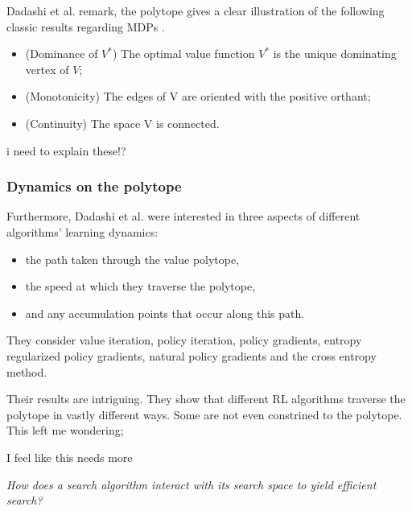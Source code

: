 Dadashi et al. remark, the polytope gives a clear illustration of the following classic results regarding MDPs \cite{Bertsekas1996}.

\begin{itemize}
\tightlist
  \item (Dominance of $V^*$) The optimal value function $V^*$ is the unique dominating vertex of $V$;
  \item (Monotonicity) The edges of V are oriented with the positive orthant;
  \item (Continuity) The space V is connected.
\end{itemize}

{\color{red} i need to explain these!?}


\subsubsection{Dynamics on the polytope}

Furthermore, Dadashi et al. were interested in three aspects of different algorithms’ learning dynamics:

\begin{itemize}
\tightlist
  \item the path taken through the value polytope,
  \item the speed at which they traverse the polytope,
  \item and any accumulation points that occur along this path.
\end{itemize}


They consider value iteration, policy iteration, policy gradients, entropy regularized policy gradients,
natural policy gradients and the cross entropy method.

Their results are intriguing. They show that different RL algorithms traverse the polytope in vastly different ways.
Some are not even constrined to the polytope. This left me wondering;

{\color{red}I feel like this needs more}

\begin{displayquote}
  \textit{How does a search algorithm interact with its search space to yield efficient search?}
\end{displayquote}

